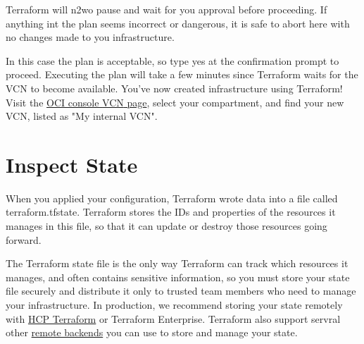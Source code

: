 \documentclass[../main.tex]{subfiles}
\begin{document}
Terraform will n2wo pause and wait for you approval before proceeding. If anything int the plan seems incorrect or dangerous, it is safe to abort here with no changes made to you infrastructure.

In this case the plan is acceptable, so type yes at the confirmation prompt to proceed. Executing the plan will take a few minutes since Terraform waits for the \gls{VCN} to become available.
You've now created infrastructure using Terraform! Visit the \href{https://cloud.oracle.com/networking/vcns}{OCI console \gls{VCN} page}, select your compartment, and find your new \gls{VCN}, listed as "My internal VCN".

\section{Inspect State}
When you applied your configuration, Terraform wrote data into a file called terraform.tfstate. Terraform stores the IDs and properties of the resources it manages in this file, so that it can update or destroy those resources going forward.

The Terraform state file is the only way Terraform can track which resources it manages, and often contains sensitive information, so you must store your state file securely and distribute it only to trusted team members who need to manage your infrastructure. In production, we recommend storing your state remotely with \href{https://cloud.hashicorp.com/products/terraform}{HCP Terraform} or Terraform Enterprise. 
Terraform also support servral other \href{https://developer.hashicorp.com/terraform/language/backend}{remote backends} you can use to store and manage your state.
\end{document}
